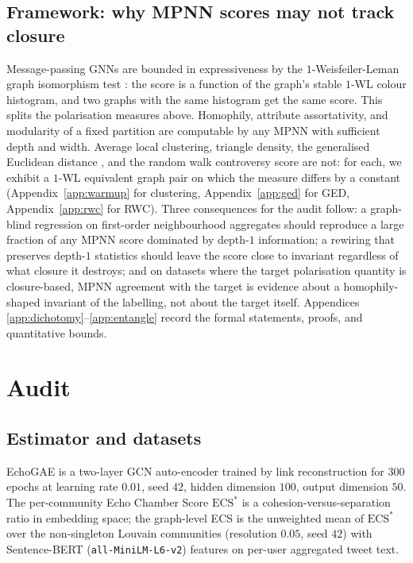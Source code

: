 \documentclass[letterpaper]{article} %
\begin{document}
\subsection{Framework: why MPNN scores may not track closure}\label{sec:framework}

Message-passing GNNs are bounded in expressiveness by the
$1$-Weisfeiler-Leman graph isomorphism test
\citep{MorrisWL2019, XuGIN2019, ChenVillar2019, AzizianLelarge2021}:
the score is a function of the graph's stable $1$-WL colour
histogram, and two graphs with the same histogram get the same
score. This splits the polarisation measures above.
Homophily, attribute assortativity, and modularity of a fixed
partition are computable by any MPNN with sufficient depth and
width. Average local clustering, triangle density, the
generalised Euclidean distance \citep{HohmannGED2023}, and the
random walk controversy score \citep{Garimella18} are not: for
each, we exhibit a $1$-WL equivalent graph pair on which the
measure differs by a constant (Appendix~\ref{app:warmup} for
clustering, Appendix~\ref{app:ged} for GED, Appendix~\ref{app:rwc}
for RWC). Three consequences for the audit follow: a graph-blind
regression on first-order neighbourhood aggregates should
reproduce a large fraction of any MPNN score dominated by
depth-$1$ information; a rewiring that preserves depth-$1$
statistics should leave the score close to invariant regardless
of what closure it destroys; and on datasets where the target
polarisation quantity is closure-based, MPNN agreement with the
target is evidence about a homophily-shaped invariant of the
labelling, not about the target itself. Appendices
\ref{app:dichotomy}--\ref{app:entangle} record the formal
statements, proofs, and quantitative bounds.

\section{Audit}\label{sec:audit}

\subsection{Estimator and datasets}

EchoGAE is a two-layer GCN auto-encoder trained by link
reconstruction for $300$ epochs at learning rate $0.01$, seed $42$,
hidden dimension $100$, output dimension $50$. The per-community
Echo Chamber Score $\mathrm{ECS}^*$ is a cohesion-versus-separation
ratio in embedding space; the graph-level ECS is the unweighted mean
of $\mathrm{ECS}^*$ over the non-singleton Louvain communities
(resolution $0.05$, seed $42$) with Sentence-BERT
(\texttt{all-MiniLM-L6-v2}) features on per-user aggregated tweet
text.
\end{document}
